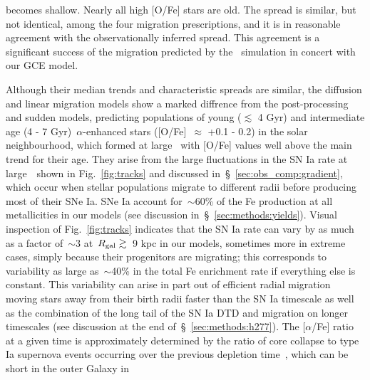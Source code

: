 \documentclass[draft2.tex]{subfiles}
\begin{document}
becomes shallow. 
Nearly all high [O/Fe] stars are old. 
The spread is similar, but not identical, among the four migration 
prescriptions, and it is in reasonable agreement with the observationally 
inferred spread. 
This agreement is a significant success of the migration predicted by the
\hsim~simulation in concert with our GCE model. 
\par 
Although their median trends and characteristic spreads are similar, the 
diffusion and linear migration models show a marked diffrence from the 
post-processing and sudden models, predicting populations of young 
($\lesssim$ 4 Gyr) and intermediate age (4 - 7 Gyr)~$\alpha$-enhanced stars 
([O/Fe]~$\approx$ +0.1 - 0.2) in the solar neighbourhood, which formed at large 
\rgal~with [O/Fe] values well above the main trend for their age. 
They arise from the large fluctuations in the SN Ia rate at large~\rgal~shown 
in Fig.~\ref{fig:tracks} and discussed in~\S~\ref{sec:obs_comp:gradient}, 
which occur when stellar populations migrate to different radii before 
producing most of their SNe Ia. 
SNe Ia account for~$\sim$60\% of the Fe production at all metallicities 
in our models (see discussion in~\S~\ref{sec:methods:yields}). 
Visual inspection of Fig.~\ref{fig:tracks} indicates that the SN Ia rate can 
vary by as much as a factor of~$\sim$3 at~$R_\text{gal}\gtrsim$~9 kpc in our models, 
sometimes more in extreme cases, simply because their progenitors are 
migrating; this corresponds to variability as large as~$\sim$40\% in the total 
Fe enrichment rate if everything else is constant. 
This variability can arise in part out of efficient radial migration moving 
stars away from their birth radii faster than the SN Ia timescale as well as 
the combination of the long tail of the SN Ia DTD and migration on longer 
timescales (see discussion at the end of~\S~\ref{sec:methods:h277}). 
The [$\alpha$/Fe] ratio at a given time is approximately determined by the 
ratio of core collapse to type Ia supernova events occurring over the previous 
depletion time~\citep{Weinberg2017}, which can be short in the outer Galaxy in 
\end{document}
